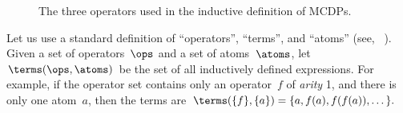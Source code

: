 \begin{figure}[h]
    \centering{}\hfill{}\hfill{}\hfill{}\smallskip{}
    \caption{\label{fig:series-par-loop}The three operators used in the inductive
    definition of MCDPs.}
\end{figure}

Let us use a standard definition of ``operators'', ``terms'',
and ``atoms'' (see, \eg~\cite[p.41]{jezek08}). Given a set
of operators~$\ops$ and a set of atoms~$\atoms$, let~$\terms(\ops,\atoms)$
be the set of all inductively defined expressions. For example, if
the operator set contains only an operator~$f$ of \emph{arity} 1,
and there is only one atom~$a$, then the terms are $\terms(\{f\},\{a\})=\{a,f(a),f(f(a)),\dots\}.$



